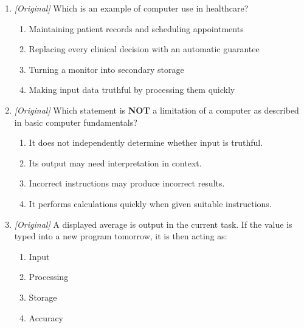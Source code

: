 \documentclass[11pt]{article}
\begin{document}
\begin{enumerate}[label=\textbf{Q\arabic*.}, leftmargin=*]
\begin{enumerate}[label=\Roman*.]
    \item Data can be raw facts or symbols.
    \item Information is data organized or processed for a purpose.
    \item The same value can be data in one task and information in another.
  \end{enumerate}
  \begin{enumerate}[label=\Alph*.]
    \item I only
    \item I and II only
    \item II and III only
    \item I, II, and III
  \end{enumerate}
\item \textit{[Original]} Which is an example of computer use in
  healthcare?
  \begin{enumerate}[label=\Alph*.]
    \item Maintaining patient records and scheduling appointments
    \item Replacing every clinical decision with an automatic guarantee
    \item Turning a monitor into secondary storage
    \item Making input data truthful by processing them quickly
  \end{enumerate}
\item \textit{[Original]} Which statement is \textbf{NOT} a limitation of a
  computer as described in basic computer fundamentals?
  \begin{enumerate}[label=\Alph*.]
    \item It does not independently determine whether input is truthful.
    \item Its output may need interpretation in context.
    \item Incorrect instructions may produce incorrect results.
    \item It performs calculations quickly when given suitable instructions.
  \end{enumerate}
\item \textit{[Original]} A displayed average is output in the current task.
  If the value is typed into a new program tomorrow, it is then acting as:
  \begin{enumerate}[label=\Alph*.]
    \item Input
    \item Processing
    \item Storage
    \item Accuracy

\end{enumerate}
\end{enumerate}
\end{document}
